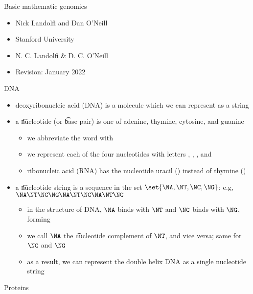   \item Basic mathematic genomics
  \begin{itemize}
\item Nick Landolfi and Dan O'Neill
\item Stanford University
\item N. C. Landolfi & D. C. O'Neill
\item Revision: January 2022
  \end{itemize}
  \item DNA
  \begin{itemize}
\item deoxyribonucleic acid (DNA) is a molecule which we can
  represent as a string
\item a \t{nucleotide} (or \t{base pair}) is one of adenine,
  thymine, cytosine, and guanine
  \begin{itemize}
  \item we abbreviate the word  with 
  \item we represent each of the four nucleotides with letters
      \NA, \NT, \NC, and \NG
  \item ribonucleic acid (RNA) has the nucleotide uracil ({\NU})
      instead of thymine ({\NT})
  \end{itemize}
\item a \t{nucleotide string} is a sequence in the set
  $\set{\NA, \NT, \NC, \NG}$; e.g, $\NA\NT\NC\NG\NA\NT\NC\NA\NT\NC$
  \begin{itemize}
  \item in the  structure of DNA, $\NA$ binds
      with $\NT$ and $\NC$ binds with $\NG$, forming
  \item we call $\NA$ the \t{nucleotide complement} of $\NT$, and
      vice versa; same for $\NC$ and $\NG$
  \item as a result, we can represent the double helix DNA as
      a single nucleotide string
  \end{itemize}
  \end{itemize}
  \item Proteins

